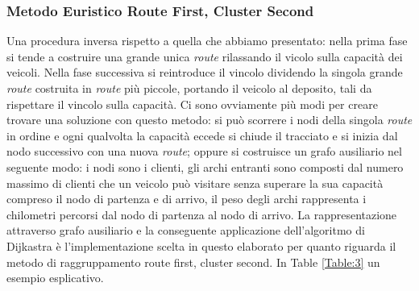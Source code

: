\documentclass[]{article}
\begin{document}
\subsubsection{Metodo Euristico Route First, Cluster Second}
Una procedura inversa rispetto a quella che abbiamo presentato: nella prima fase si tende a costruire una grande unica \emph{route} rilassando il vicolo sulla capacità dei veicoli. Nella fase successiva si reintroduce il vincolo dividendo la singola grande \emph{route} costruita in \emph{route}  più piccole, portando il veicolo al deposito, tali da rispettare il vincolo sulla capacità. Ci sono ovviamente più modi per creare trovare una soluzione con questo metodo: si può scorrere i nodi della singola \emph{route} in ordine e ogni qualvolta la capacità eccede si chiude il tracciato e si inizia dal nodo successivo con una nuova  \emph{route}; oppure si costruisce un grafo ausiliario nel seguente modo: i nodi sono i clienti, gli archi entranti sono composti dal numero massimo di clienti che un veicolo può visitare senza superare la sua capacità compreso il nodo di partenza e di arrivo, il peso degli archi rappresenta i chilometri percorsi dal nodo di partenza al nodo di arrivo.
La rappresentazione attraverso grafo ausiliario e la conseguente applicazione dell'algoritmo di Dijkastra è l'implementazione  scelta in questo elaborato per quanto riguarda il metodo di raggruppamento route first, cluster second. In Table \ref{Table:3} un esempio esplicativo.
\end{document}
